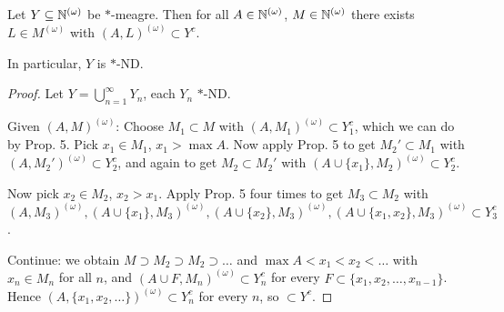 \documentclass[10pt]{article}
\newcommand{\bom}{{(\omega)}}
\begin{document}
\begin{theorem}
    Let $Y\subset \N^\bom$ be $\ast$-meagre. Then for all $A \in \N^\bom$, $M \in \N^\bom$ there exists $L \in M^\bom$ with $(A,L)^\bom \subset Y^c$.

    In particular, $Y$ is $\ast$-ND.
\end{theorem}
\begin{proof}
    Let $Y = \bigcup_{n=1}^\infty Y_n$, each $Y_n$ $\ast$-ND.

    Given $(A,M)^\bom$: Choose $M_1 \subset M$ with $(A,M_1)^\bom \subset Y_1^c$, which we can do by Prop. 5. Pick $x_1 \in M_1$, $x_1 > \max A$. Now apply Prop. 5 to get $M_2'\subset M_1$ with $(A,M_2')^\bom\subset Y_2^c$, and again to get $M_2 \subset M_2'$ with $(A\cup\{x_1\},M_2)^\bom \subset Y_2^c$.

    Now pick $x_2 \in M_2$, $x_2 > x_1$. Apply Prop. 5 four times to get $M_3 \subset M_2$ with $(A,M_3)^\bom,(A\cup\{x_1\},M_3)^\bom,(A\cup\{x_2\},M_3)^\bom,(A\cup\{x_1,x_2\},M_3)^\bom\subset Y_3^c$.

    Continue: we obtain $M\supset M_2 \supset M_2\supset \dots$ and $\max A < x_1 < x_2 <\dots$ with $x_n \in M_n$ for all $n$, and $(A\cup F,M_n)^\bom\subset Y_n^c$ for every $F \subset \{x_1,x_2,\dots,x_{n-1}\}$. Hence $(A,\{x_1,x_2,\dots\})^\bom \subset Y_n^c$ for every $n$, so $\subset Y^c$.
\end{proof}

\end{document}
